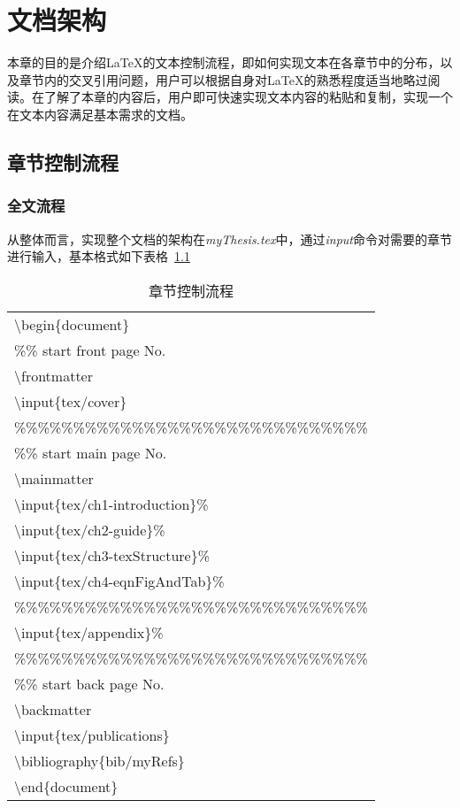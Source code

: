 
\chapter{文档架构}
\label{chap:textStructure}

本章的目的是介绍\LaTeX{}的文本控制流程，即如何实现文本在各章节中的分布，以及章节内的交叉引用问题，用户可以根据自身对\LaTeX{}的熟悉程度适当地略过阅读。在了解了本章的内容后，用户即可快速实现文本内容的粘贴和复制，实现一个在文本内容满足基本需求的文档。

\section{章节控制流程}
\label{sec:controlFlow}
\subsection{全文流程}
从整体而言，实现整个文档的架构在{\it{myThesis.tex}}中，通过{\it{input}}命令对需要的章节进行输入，基本格式如下表格~\ref{tab:controlFlow}


\begin{table}
 \centering
  \caption{章节控制流程}        %
  \label{tab:controlFlow}    %
   \begin{tabular}{l}
   \hline
   \textbackslash begin\{document\}                \\
   \%\% start front page No.                       \\
   \textbackslash frontmatter                      \\   
   \textbackslash input\{tex/cover\}                 \\
   \%\%\%\%\%\%\%\%\%\%\%\%\%\%\%\%\%\%\%\%\%\%\%\%\%\%\%\%\%\% \\
   \%\% start main page No.                        \\
   \textbackslash mainmatter                       \\   
   \textbackslash input\{tex/ch1-introduction\}\%    \\
   \textbackslash input\{tex/ch2-guide\}\%           \\
   \textbackslash input\{tex/ch3-texStructure\}\%    \\
   \textbackslash input\{tex/ch4-eqnFigAndTab\}\%    \\
   \%\%\%\%\%\%\%\%\%\%\%\%\%\%\%\%\%\%\%\%\%\%\%\%\%\%\%\%\%\% \\
   \textbackslash input\{tex/appendix\}\%            \\
   \%\%\%\%\%\%\%\%\%\%\%\%\%\%\%\%\%\%\%\%\%\%\%\%\%\%\%\%\%\% \\
   \%\% start back page No.                        \\
   \textbackslash backmatter                       \\ 
   \textbackslash input\{tex/publications\}          \\
   \textbackslash bibliography\{bib/myRefs\}         \\
   \textbackslash end\{document\}                    \\
   \hline              
  \end{tabular}
\end{table}


